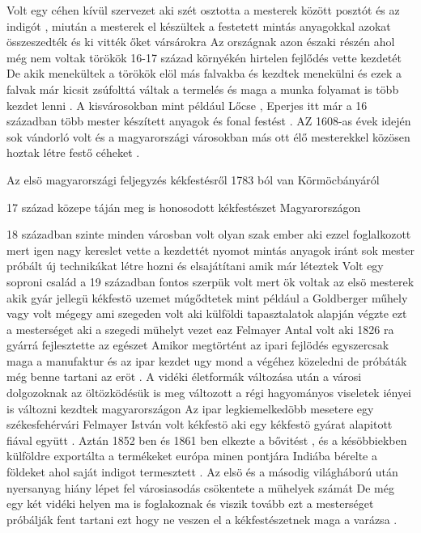 \documentclass[fontsize=12pt, appendixprefix=true]{scrreprt}
\begin{document}
 Volt egy céhen kívül szervezet aki szét osztotta a mesterek között  posztót és az indigót , miután a mesterek el készültek a festetett mintás anyagokkal azokat összeszedték és ki vitték őket vársárokra 
 Az országnak azon északi részén ahol még nem voltak törökök 16-17 század környékén hirtelen fejlődés vette kezdetét 
 De akik menekültek a törökök elöl más falvakba és kezdtek menekülni és ezek a falvak már kicsit zsúfolttá váltak a termelés és maga a munka folyamat is több kezdet lenni .
 A kisvárosokban mint például Lőcse , Eperjes itt már a 16 században több mester  készített anyagok és fonal festést .
 AZ 1608-as évek idején sok vándorló volt és a magyarországi városokban más ott élő mesterekkel közösen hoztak létre festő céheket .

 Az elsö magyarországi feljegyzés kékfestésről 1783 ból van Körmöcbányáról 

 17 század közepe táján  meg is honosodott kékfestészet Magyarországon 

 18 században szinte minden városban volt olyan szak ember aki ezzel foglalkozott mert igen nagy kereslet vette a kezdettét nyomot mintás anyagok iránt sok mester próbált új technikákat létre hozni és elsajátítani amik már léteztek 
 Volt egy soproni család a 19 században  fontos szerpük volt mert ök voltak az elsö mesterek akik gyár jellegü kékfestö uzemet múgődtetek mint például a Goldberger műhely vagy volt mégegy ami szegeden volt  aki külföldi tapasztalatok alapján végzte ezt a mesterséget  aki a szegedi mühelyt vezet eaz Felmayer Antal volt aki 1826 ra gyárrá fejlesztette az egészet 
 Amikor megtörtént az ipari fejlödés egyszercsak maga a manufaktur és az ipar kezdet ugy mond a végéhez közeledni de próbáták még benne tartani az eröt .
A vidéki életformák változása után a városi dolgozoknak az öltözködésük is meg változott a régi hagyományos viseletek iényei is változni kezdtek magyarországon 
Az ipar legkiemelkedöbb mesetere egy székesfehérvári Felmayer István volt  kékfestö  aki egy kékfestö gyárat alapitott fiával együtt .
Aztán 1852 ben és 1861 ben  elkezte a bővitést , és a késöbbiekben külföldre exportálta a termékeket európa minen pontjára Indiába bérelte a földeket ahol saját indigot termesztett .
Az elsö és a másodig világháború után nyersanyag hiány lépet fel városiasodás csökentete a mühelyek számát 
De még egy két vidéki helyen ma is foglakoznak és viszik tovább ezt a mesterséget próbálják fent tartani ezt hogy ne veszen el a kékfestészetnek maga a varázsa .

 
\end{document}
